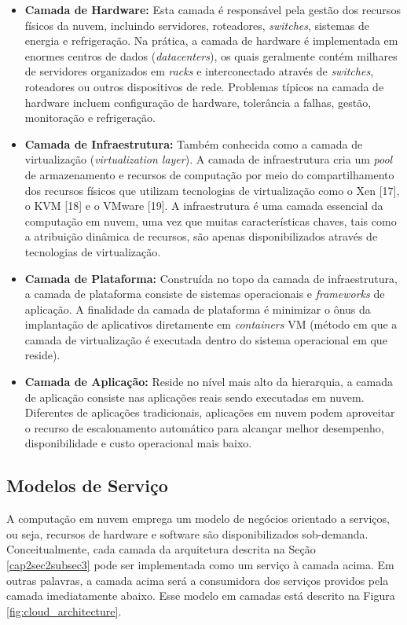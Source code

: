 \begin{itemize}
	\item \textbf{Camada de Hardware:} Esta camada é responsável pela gestão dos recursos físicos da nuvem, incluindo servidores, roteadores, \textit{switches}, sistemas de energia e refrigeração. Na prática, a camada de hardware é implementada em enormes centros de dados (\textit{datacenters}), os quais geralmente contém milhares de servidores organizados em \textit{racks} e interconectado através de \textit{switches}, roteadores ou outros dispositivos de rede. Problemas típicos na camada de hardware incluem configuração de hardware, tolerância a falhas, gestão, monitoração e refrigeração.
    \item \textbf{Camada de Infraestrutura:} Também conhecida como a camada de virtualização (\textit{virtualization layer}). A camada de infraestrutura cria um \textit{pool} de armazenamento e recursos de computação por meio do compartilhamento dos recursos físicos que utilizam tecnologias de virtualização como o Xen [17], o KVM [18] e o VMware [19]. A infraestrutura é uma camada essencial da computação em nuvem, uma vez que muitas características chaves, tais como a atribuição dinâmica de recursos, são apenas disponibilizados através de tecnologias de virtualização.
    \item \textbf{Camada de Plataforma:} Construída no topo da camada de infraestrutura, a camada de plataforma consiste de sistemas operacionais e \textit{frameworks} de aplicação. A finalidade da camada de plataforma é minimizar o ônus da implantação de aplicativos diretamente em \textit{containers} VM (método em que a camada de virtualização é executada dentro do sistema operacional em que reside).
    \item \textbf{Camada de Aplicação:} Reside no nível mais alto da hierarquia, a camada de aplicação consiste nas aplicações reais sendo executadas em nuvem. Diferentes de aplicações tradicionais, aplicações em nuvem podem aproveitar o recurso de escalonamento automático para alcançar melhor desempenho, disponibilidade e custo operacional mais baixo.
\end{itemize}

\subsection{Modelos de Serviço} \label{cap2sec2subsec4}

A computação em nuvem emprega um modelo de negócios orientado a serviços, ou seja, recursos de hardware e software são disponibilizados sob-demanda. Conceitualmente, cada camada da arquitetura descrita na Seção \ref{cap2sec2subsec3} pode ser implementada como um serviço à camada acima. Em outras palavras, a camada acima será a consumidora dos serviços providos pela camada imediatamente abaixo. Esse modelo em camadas está descrito na Figura \ref{fig:cloud_architecture}.

